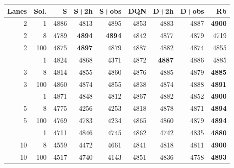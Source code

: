 \begin{tabular}{rrrrrrrrr}
\toprule
Lanes & Sol. & S & S+2h & S+obs & DQN & D+2h & D+obs & Rb \\
\midrule
2 & 1 & 4886 & 4813 & 4895 & 4853 & 4883 & 4887 & \textbf{4900} \\
2 & 8 & 4789 & \textbf{4894} & \textbf{4894} & 4842 & 4877 & 4879 & 4719 \\
2 & 100 & 4875 & \textbf{4897} & 4879 & 4887 & 4882 & 4874 & 4855 \\
\addlinespace
3 & 1 & 4824 & 4868 & 4371 & 4872 & \textbf{4887} & 4886 & 4885 \\
3 & 8 & 4814 & 4855 & 4860 & 4876 & 4885 & 4879 & \textbf{4885} \\
3 & 100 & 4860 & 4874 & 4855 & 4838 & 4874 & 4888 & \textbf{4891} \\
\addlinespace
5 & 1 & 4871 & 4848 & 4812 & 4867 & 4882 & 4852 & \textbf{4900} \\
5 & 8 & 4775 & 4256 & 4253 & 4818 & 4878 & 4871 & \textbf{4894} \\
5 & 100 & 4769 & 4783 & 4234 & 4865 & 4860 & 4879 & \textbf{4894} \\
\addlinespace
10 & 1 & 4711 & 4846 & 4745 & 4862 & 4742 & 4835 & \textbf{4880} \\
10 & 8 & 4559 & 4472 & 4661 & 4841 & 4818 & 4811 & \textbf{4900} \\
10 & 100 & 4517 & 4740 & 4143 & 4851 & 4836 & 4758 & \textbf{4893} \\
\bottomrule
\end{tabular}
